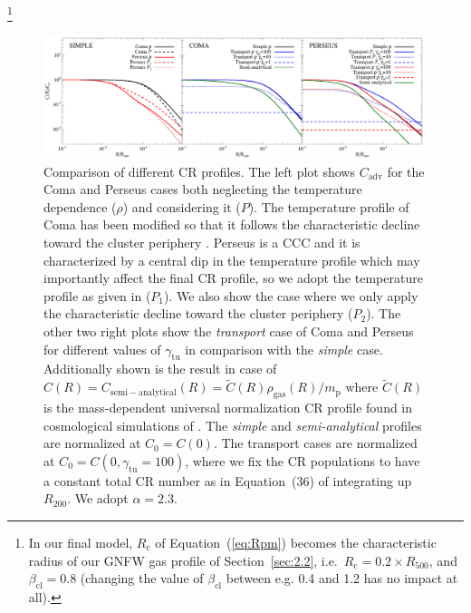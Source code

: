 \documentclass[traditabstract]{aa}
\newcommand{\rmn}{\mathrm}
\begin{document}
\begin{appendix}
\footnote[10]{In our final model, $R_{\rmn{c}}$ of
  Equation~(\ref{eq:Rpm}) becomes the characteristic radius of our GNFW gas
  profile of Section~\ref{sec:2.2}, i.e.~$R_{\rmn{c}}=0.2\times R_{500}$, and
  $\beta_{\rmn{cl}}=0.8$ (changing the value of $\beta_{\rmn{cl}}$ between
  e.g. 0.4 and 1.2 has no impact at all).}



\begin{figure}[t]
\centering
\includegraphics[width=0.99\textwidth]{figures/CR_profiles_simple_comparison.eps}
\caption{Comparison of different CR profiles. The left plot shows $C_{\rmn{adv}}$ for the Coma and Perseus cases both neglecting the temperature dependence ($\rho$) and considering it ($P$). The temperature profile of Coma has been modified so that it follows the characteristic decline toward the cluster periphery \citep{2007MNRAS.378..385P,2010MNRAS.409..449P}. Perseus is a CCC and it is characterized by a central dip in the temperature profile which may importantly affect the final CR profile, so we adopt the temperature profile as given in \citep{2004A&A...413...17P} ($P_{1}$). We also show the case where we only apply the characteristic decline toward the cluster periphery ($P_{2}$). The other two right plots show the \emph{transport} case of Coma and Perseus for different values of $\gamma_{\rmn{tu}}$ in comparison with the \emph{simple} case. Additionally shown is the result in case of $C(R)=C_{\rmn{semi-analytical}}(R)=\tilde{C}(R)\rho_{\rmn{gas}}(R)/m_{\rmn{p}}$ where $\tilde{C}(R)$ is the mass-dependent universal normalization CR profile found in cosmological simulations of \cite{2010MNRAS.409..449P}. The \emph{simple} and \emph{semi-analytical} profiles are normalized at $C_{0}=C(0)$. The transport cases are normalized at $C_{0}=C(0,\gamma_{\rmn{tu}}=100)$, where we fix the CR populations to have a constant total CR number as in Equation~(36) of \cite{2011A&A...527A..99E} integrating up $R_{200}$. We adopt $\alpha=2.3$.}
\label{fig:simpleVStransport}
\end{figure}


\end{appendix}
\end{document}
